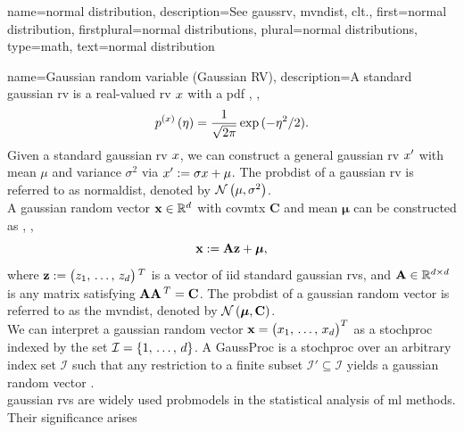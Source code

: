 {name={normal distribution}, 
	description={See \gls{gaussrv}, \gls{mvndist}, \gls{clt}.},
 	first={normal distribution}, 
 	firstplural={normal distributions},
 	plural={normal distributions},
	type=math, 
 	text={normal distribution}
}

{name={Gaussian random variable (Gaussian RV)}, 
	description={A standard \gls{gaussian} \gls{rv} is a 
		real-valued \gls{rv} $x$ with a \gls{pdf} \cite{BertsekasProb}, \cite{GrayProbBook}, \cite{papoulis}
		\begin{equation}
			\nonumber
			p^{(x)}\left(\eta\right) = \frac{1}{\sqrt{2\pi}} \exp\,(-\eta^2/2). 
		\end{equation}
		Given a standard \gls{gaussian} \gls{rv} $x$, we can construct a general \gls{gaussian} 
		\gls{rv} $x'$ with \gls{mean} $\mu$ and \gls{variance} $\sigma^2$ via 
		$x' := \sigma x + \mu$. 
		The \gls{probdist} of a \gls{gaussian} \gls{rv} is referred to as \gls{normaldist}, 
		denoted by $\mathcal{N}\left(\mu,\sigma^{2}\right)$. 
		\\ 
		A \gls{gaussian} random \gls{vector} ${\bf x} \in \mathbb{R}^{d}$ with 
		\gls{covmtx} $\mathbf{C}$ and \gls{mean} ${\bm \mu}$ can be constructed as \cite{GrayProbBook}, \cite{papoulis}, \cite{Lapidoth09}
		\[
		{\bf x} := \mathbf{A} {\bf z} + {\bm \mu},
		\]
		where ${\bf z} := \big( z_{1}, \,\ldots, \,z_{d} \big)\,^{T}$ is a \gls{vector} 
		of \gls{iid} standard \gls{gaussian} \glspl{rv}, and ${\bf A} \in \mathbb{R}^{d \times d}$ is any \gls{matrix} satisfying ${\bf A} {\bf A}\,^{T} = {\bf C}$. 
		The \gls{probdist} of a \gls{gaussian} random \gls{vector} is referred to as the \gls{mvndist}, 
		denoted by $\mathcal{N}\left(\bm \mu,\mathbf{C}\right)$.
		\\
		We can interpret a \gls{gaussian} random \gls{vector} ${\bf x}=\big(x_{1},\,\ldots,\,x_{d}\big)^{T}$ as a \gls{stochproc} 
		indexed by the set $\mathcal{I}=\{1,\,\ldots,\,d\}$. A \gls{GaussProc} is a 
		\gls{stochproc} over an arbitrary index set $\mathcal{I}$ such that any restriction 
		to a finite subset $\mathcal{I}' \subseteq \mathcal{I}$ yields a \gls{gaussian} 
		random \gls{vector} \cite{Rasmussen2006Gaussian}.
  		\\
        		\Gls{gaussian} \glspl{rv} are widely used \glspl{probmodel} in the 
		statistical analysis of \gls{ml} methods. Their significance arises 
}}
